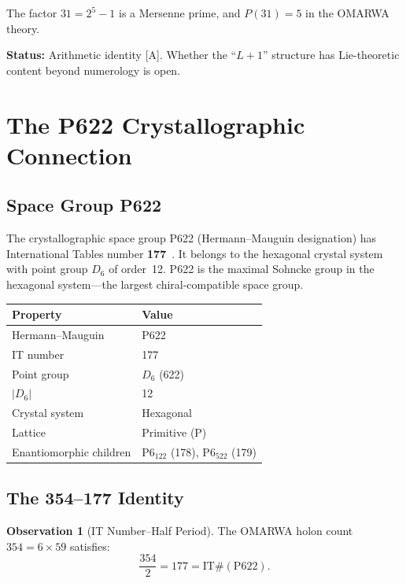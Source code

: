\documentclass[11pt, a4paper]{article}
\theoremstyle{plain}
\theoremstyle{definition}
\newtheorem{observation}{Observation}[section]
\theoremstyle{remark}
\begin{document}
The factor $31 = 2^5 - 1$ is a Mersenne prime, and $P(31) = 5$ in
the OMARWA theory.

\textbf{Status:} Arithmetic identity [A]. Whether the ``$L+1$''
structure has Lie-theoretic content beyond numerology is open.

\section{The P622 Crystallographic Connection}
\label{sec:p622}

\subsection{Space Group P622}

The crystallographic space group P622 (Hermann--Mauguin designation)
has International Tables number \textbf{177}~\cite{hahn}. It belongs
to the hexagonal crystal system with point group $D_6$ of order~12.
P622 is the maximal Sohncke group in the hexagonal system---the
largest chiral-compatible space group.

\begin{center}
\begin{tabular}{@{}ll@{}}
\toprule
Property & Value \\
\midrule
Hermann--Mauguin & P622 \\
IT number & 177 \\
Point group & $D_6$ (622) \\
$|D_6|$ & 12 \\
Crystal system & Hexagonal \\
Lattice & Primitive (P) \\
Enantiomorphic children & P$6_122$ (178), P$6_522$ (179) \\
\bottomrule
\end{tabular}
\end{center}

\subsection{The 354--177 Identity}

\begin{observation}[IT Number--Half Period]
\label{obs:p622}
The OMARWA holon count $354 = 6 \times 59$ satisfies:
\begin{equation}
\frac{354}{2} = 177 = \mathrm{IT\#}(\text{P622}).
\end{equation}
\end{observation}
\end{document}
